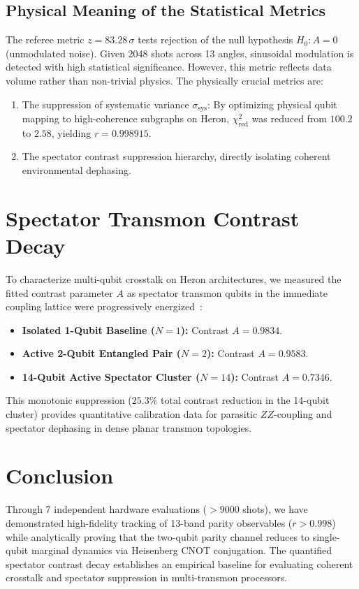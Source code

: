 \documentclass[11pt,a4paper]{article}
\begin{document}
\subsection{Physical Meaning of the Statistical Metrics}
The referee metric $z = 83.28\,\sigma$ tests rejection of the null hypothesis $H_0: A = 0$ (unmodulated noise). Given 2048 shots across 13 angles, sinusoidal modulation is detected with high statistical significance. However, this metric reflects data volume rather than non-trivial physics. The physically crucial metrics are:
\begin{enumerate}
  \item The suppression of systematic variance $\sigma_{\text{sys}}$: By optimizing physical qubit mapping to high-coherence subgraphs on Heron, $\chi^2_{\text{red}}$ was reduced from $100.2$ to $2.58$, yielding $r = 0.998915$.
  \item The spectator contrast suppression hierarchy, directly isolating coherent environmental dephasing.
\end{enumerate}

\section{Spectator Transmon Contrast Decay}
To characterize multi-qubit crosstalk on Heron architectures, we measured the fitted contrast parameter $A$ as spectator transmon qubits in the immediate coupling lattice were progressively energized~\cite{mundada2019crosstalk}:

\begin{itemize}
  \item \textbf{Isolated 1-Qubit Baseline ($N=1$):} Contrast $A = 0.9834$.
  \item \textbf{Active 2-Qubit Entangled Pair ($N=2$):} Contrast $A = 0.9583$.
  \item \textbf{14-Qubit Active Spectator Cluster ($N=14$):} Contrast $A = 0.7346$.
\end{itemize}

This monotonic suppression ($25.3\%$ total contrast reduction in the 14-qubit cluster) provides quantitative calibration data for parasitic $ZZ$-coupling and spectator dephasing in dense planar transmon topologies.

\section{Conclusion}
Through 7 independent hardware evaluations ($>9000$ shots), we have demonstrated high-fidelity tracking of 13-band parity observables ($r > 0.998$) while analytically proving that the two-qubit parity channel reduces to single-qubit marginal dynamics via Heisenberg CNOT conjugation. The quantified spectator contrast decay establishes an empirical baseline for evaluating coherent crosstalk and spectator suppression in multi-transmon processors.
\end{document}
